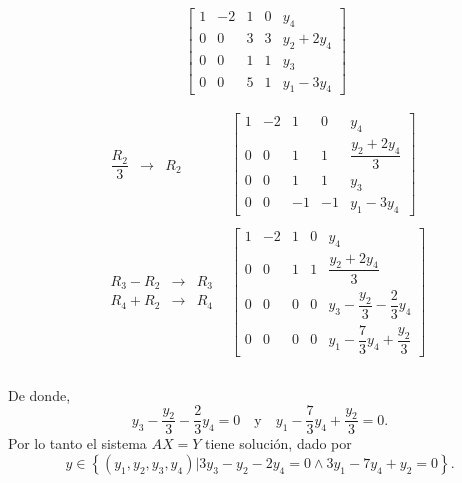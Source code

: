 \begin{enumerate}[\bfseries 1.]
$$\begin{array}{ccc}
	    &
	    \left[\begin{array}{rrrr|r}
		1 & -2 & 1 & 0 & y_4 \\
		0 & 0 & 3 & 3 & y_2+2y_4 \\
		0 & 0 & 1 & 1 & y_3 \\
		0 & 0 & 5 & 1 & y_1-3y_4
	    \end{array}\right]\\\\
	    \end{array}$$
	    $$\begin{array}{rcl}
	    &
	    \begin{array}{rcl}
		\dfrac{R_2}{3} &\to& R_2
	    \end{array}
	    &
	    \left[\begin{array}{rrrr|r}
		1 & -2 & 1 & 0 & y_4 \\
		0 & 0 & 1 & 1 & \dfrac{y_2+2y_4}{3}\\
		0 & 0 & 1 & 1 & y_3 \\
		0 & 0 & -1 & -1 & y_1-3y_4
	    \end{array}\right]\\\\
	    &
	    \begin{array}{rcl}
		R_3-R_2 &\to& R_3 \\
		R_4+R_2 &\to& R_4
	    \end{array}
	    &
	    \left[\begin{array}{rrrr|r}
		1 & -2 & 1 & 0 & y_4 \\
		0 & 0 & 1 & 1 & \dfrac{y_2+2y_4}{3}\\
		0 & 0 & 0 & 0 & y_3-\dfrac{y_2}{3}-\dfrac{2}{3}y_4\\
		0 & 0 & 0 & 0 & y_1-\dfrac{7}{3}y_4+\dfrac{y_2}{3}
	    \end{array}\right]\\\\
	\end{array}$$

	De donde,
	$$y_3-\dfrac{y_2}{3}-\dfrac{2}{3}y_4=0\quad \mbox{y}\quad y_1-\dfrac{7}{3}y_4+\dfrac{y_2}{3}=0.$$
	Por lo tanto el sistema $AX=Y$ tiene solución, dado por
	$$y\in \left\{(y_1,y_2,y_3,y_4)|3y_3-y_2-2y_4=0 \land 3y_1-7y_4+y_2=0\right\}.$$\\


\end{enumerate}
